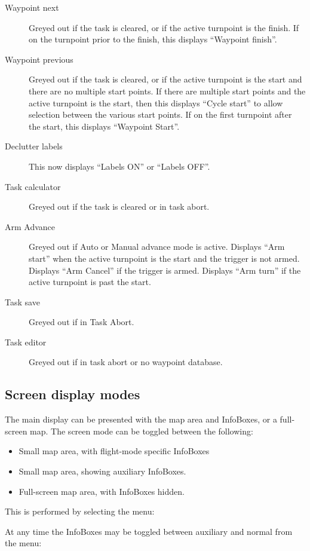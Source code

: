 \documentclass[a4paper,12pt]{refrep}
\newcommand{\InfoBox}[0]{{InfoBox}}
\begin{document}
\begin{description}
\item[Waypoint next]  
  Greyed out if the task is cleared, or if the active turnpoint is the
  finish.  If on the turnpoint prior to the finish, this displays
  ``Waypoint finish''.
\item[Waypoint previous]  
  Greyed out if the task is cleared, or if the active turnpoint is the
  start and there are no multiple start points.  If there are multiple
  start points and the active turnpoint is the start, then this
  displays ``Cycle start'' to allow selection between the various
  start points.  If on the first turnpoint after the start, this
  displays ``Waypoint Start''.
\item[Declutter labels]  
  This now displays ``Labels ON'' or ``Labels OFF''.
\item[Task calculator]  
  Greyed out if the task is cleared or in task abort.
\item[Arm Advance]  
  Greyed out if Auto or Manual advance mode is active.  Displays ``Arm
  start'' when the active turnpoint is the start and the trigger is
  not armed.  Displays ``Arm Cancel'' if the trigger is armed.
  Displays ``Arm turn'' if the active turnpoint is past the start.
\item[Task save]
  Greyed out if in Task Abort.
\item[Task editor]
  Greyed out if in task abort or no waypoint database.
\end{description}

\subsection*{Screen display modes}

The main display can be presented with the map area and InfoBoxes, or
a full-screen map.  The screen mode can be toggled between the following:
\begin{itemize}
\item Small map area, with flight-mode specific {\InfoBox}es
\item Small map area, showing auxiliary {\InfoBox}es.
\item Full-screen map area, with {\InfoBox}es hidden.
\end{itemize}
This is performed by selecting the menu:
\begin{quote}
\blink{}
\end{quote}

At any time the InfoBoxes may be toggled between auxiliary and normal from
the menu:
\begin{quote}
\blink{}
\end{quote}
\end{document}

